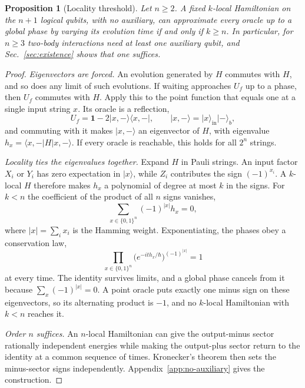 \documentclass[11pt,a4paper]{article}
\providecommand{\openone}{\mathbf{1}}
\newtheorem{proposition}[theorem]{Proposition}
\newcommand{\ket}[1]{\lvert #1\rangle}
\newcommand{\bra}[1]{\langle #1\rvert}
\newcommand{\id}{\openone}
\begin{document}
\begin{proposition}[Locality threshold]
\label{prop:aux}
Let $n\ge2$. A fixed $k$-local Hamiltonian on the $n+1$ logical qubits, with no auxiliary, can approximate every oracle up to a global phase by varying its evolution time if and only if $k\ge n$. In particular, for $n\ge3$ two-body interactions need at least one auxiliary qubit, and Sec.~\ref{sec:existence} shows that one suffices.
\end{proposition}

\begin{proof}
\emph{Eigenvectors are forced.} An evolution generated by $H$ commutes with $H$, and so does any limit of such evolutions. If waiting approaches $U_f$ up to a phase, then $U_f$ commutes with $H$. Apply this to the point function that equals one at a single input string $x$. Its oracle is a reflection,
\begin{equation}
 U_f=\id-2\ket{x,-}\bra{x,-},\qquad
 \ket{x,-}=\ket{x}_{\mathrm{in}}\ket-_b,
\end{equation}
and commuting with it makes $\ket{x,-}$ an eigenvector of $H$, with eigenvalue $h_x=\bra{x,-}H\ket{x,-}$. If every oracle is reachable, this holds for all $2^n$ strings.

\emph{Locality ties the eigenvalues together.} Expand $H$ in Pauli strings. An input factor $X_i$ or $Y_i$ has zero expectation in $\ket{x}$, while $Z_i$ contributes the sign $(-1)^{x_i}$. A $k$-local $H$ therefore makes $h_x$ a polynomial of degree at most $k$ in the signs. For $k<n$ the coefficient of the product of all $n$ signs vanishes,
\begin{equation}
 \sum_{x\in\{0,1\}^n}(-1)^{|x|}h_x=0,
\end{equation}
where $|x|=\sum_i x_i$ is the Hamming weight. Exponentiating, the phases obey a conservation law,
\begin{equation}
 \prod_{x\in\{0,1\}^n}\bigl(e^{-ith_x/\hbar}\bigr)^{(-1)^{|x|}}=1
 \label{eq:parity}
\end{equation}
at every time. The identity survives limits, and a global phase cancels from it because $\sum_x(-1)^{|x|}=0$. A point oracle puts exactly one minus sign on these eigenvectors, so its alternating product is $-1$, and no $k$-local Hamiltonian with $k<n$ reaches it.

\emph{Order $n$ suffices.} An $n$-local Hamiltonian can give the output-minus sector rationally independent energies while making the output-plus sector return to the identity at a common sequence of times. Kronecker's theorem then sets the minus-sector signs independently. Appendix~\ref{app:no-auxiliary} gives the construction.
\end{proof}
\end{document}
